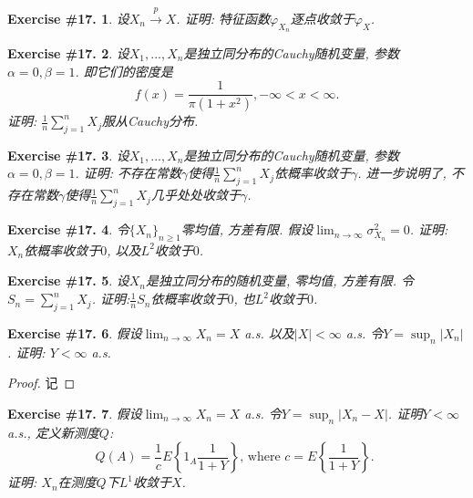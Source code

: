 \documentclass[UTF8, a4paper]{article}
\newtheorem{exercise}{Exercise \#17.}
\begin{document}
\begin{exercise}
设\(X_n \overset{p}{\to} X\). 证明: 特征函数\(\varphi_{X_n}\)逐点收敛于\(\varphi_X\).
\end{exercise}



\begin{exercise}
设\(X_1, ..., X_n\)是独立同分布的Cauchy随机变量, 参数\(\alpha = 0, \beta = 1\).
即它们的密度是
$$
f(x) = \frac{1}{\pi(1+x^2)}, -\infty < x < \infty.
$$
证明: \(\frac{1}{n}\sum_{j=1}^{n}X_j\)服从Cauchy分布.
\end{exercise}

\begin{exercise}
    设\(X_1, ..., X_n\)是独立同分布的Cauchy随机变量, 参数\(\alpha = 0, \beta = 1\).
证明: 不存在常数\(\gamma\)使得\(\frac{1}{n}\sum_{j=1}^{n}X_j\)依概率收敛于\(\gamma\).
进一步说明了, 不存在常数\(\gamma\)使得\(\frac{1}{n}\sum_{j=1}^{n}X_j\)几乎处处收敛于\(\gamma\).
\end{exercise}



\begin{exercise}
令\(\{X_n\}_{n\geq 1}\)零均值, 方差有限. 
假设\(\lim_{n\to \infty} \sigma_{X_n}^2 = 0\).
证明: \(X_n\)依概率收敛于\(0\), 以及\(L^2\)收敛于\(0\).
\end{exercise}



\begin{exercise}
设\(X_n\)是独立同分布的随机变量, 零均值, 方差有限.
令\(S_n = \sum_{j=1}^{n}X_j\).
证明:\(\frac{1}{n}S_n\)依概率收敛于\(0\), 也\(L^2\)收敛于\(0\).
\end{exercise}


\begin{framed}
\begin{exercise}
假设\(\lim_{n\to\infty} X_n = X\) a.s. 以及\(|X| < \infty\) a.s. 令\(Y = \sup_n |X_n|\).
证明: \(Y < \infty\) a.s.
\end{exercise}
\end{framed}

\begin{proof}
记
\end{proof}



\begin{framed}
\begin{exercise}
假设\(\lim_{n\to\infty} X_n = X\) a.s. 令\(Y = \sup_n|X_n - X|\).
证明\(Y < \infty\) a.s., 定义新测度\(Q\):
$$
Q(A)=\frac{1}{c} E\left\{1_A \frac{1}{1+Y}\right\} \text {, where } c=E\left\{\frac{1}{1+Y}\right\} \text {. }
$$
证明: \(X_n\)在测度\(Q\)下\(L^1\)收敛于\(X\).
\end{exercise}
\end{framed}
\end{document}
